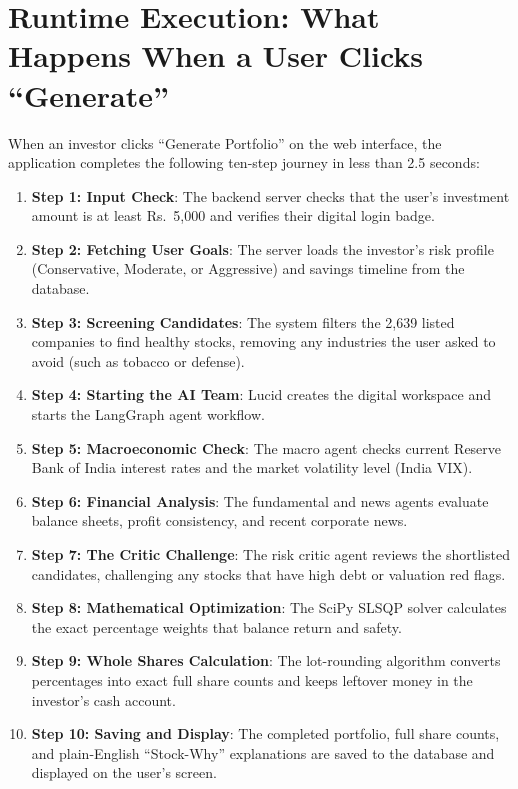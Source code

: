\section{Runtime Execution: What Happens When a User Clicks ``Generate''}
When an investor clicks ``Generate Portfolio'' on the web interface, the application completes the following ten-step journey in less than 2.5 seconds:
\begin{enumerate}
    \item \textbf{Step 1: Input Check}: The backend server checks that the user's investment amount is at least Rs.~5,000 and verifies their digital login badge.
    \item \textbf{Step 2: Fetching User Goals}: The server loads the investor's risk profile (Conservative, Moderate, or Aggressive) and savings timeline from the database.
    \item \textbf{Step 3: Screening Candidates}: The system filters the 2,639 listed companies to find healthy stocks, removing any industries the user asked to avoid (such as tobacco or defense).
    \item \textbf{Step 4: Starting the AI Team}: Lucid creates the digital workspace and starts the LangGraph agent workflow.
    \item \textbf{Step 5: Macroeconomic Check}: The macro agent checks current Reserve Bank of India interest rates and the market volatility level (India VIX).
    \item \textbf{Step 6: Financial Analysis}: The fundamental and news agents evaluate balance sheets, profit consistency, and recent corporate news.
    \item \textbf{Step 7: The Critic Challenge}: The risk critic agent reviews the shortlisted candidates, challenging any stocks that have high debt or valuation red flags.
    \item \textbf{Step 8: Mathematical Optimization}: The SciPy SLSQP solver calculates the exact percentage weights that balance return and safety.
    \item \textbf{Step 9: Whole Shares Calculation}: The lot-rounding algorithm converts percentages into exact full share counts and keeps leftover money in the investor's cash account.
    \item \textbf{Step 10: Saving and Display}: The completed portfolio, full share counts, and plain-English ``Stock-Why'' explanations are saved to the database and displayed on the user's screen.
\end{enumerate}

